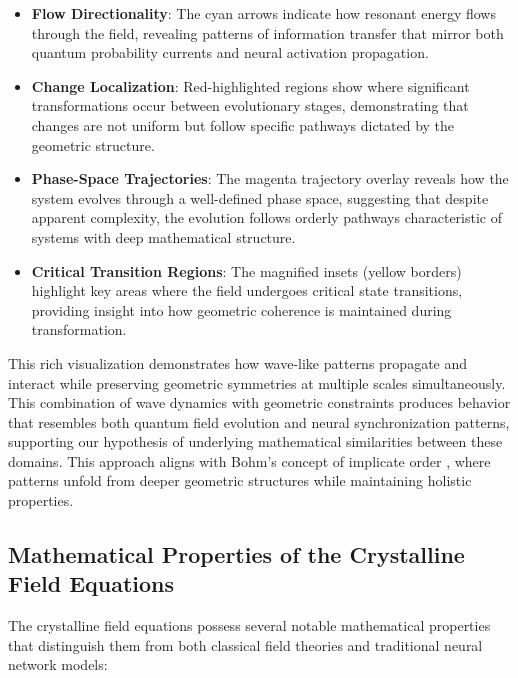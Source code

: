 \documentclass[12pt,letterpaper]{article}
\begin{document}
\begin{itemize}
    \item \textbf{Flow Directionality}: The cyan arrows indicate how resonant energy flows through the field, revealing patterns of information transfer that mirror both quantum probability currents and neural activation propagation.
    \item \textbf{Change Localization}: Red-highlighted regions show where significant transformations occur between evolutionary stages, demonstrating that changes are not uniform but follow specific pathways dictated by the geometric structure.
    \item \textbf{Phase-Space Trajectories}: The magenta trajectory overlay reveals how the system evolves through a well-defined phase space, suggesting that despite apparent complexity, the evolution follows orderly pathways characteristic of systems with deep mathematical structure.
    \item \textbf{Critical Transition Regions}: The magnified insets (yellow borders) highlight key areas where the field undergoes critical state transitions, providing insight into how geometric coherence is maintained during transformation.
\end{itemize}

This rich visualization demonstrates how wave-like patterns propagate and interact while preserving geometric symmetries at multiple scales simultaneously. This combination of wave dynamics with geometric constraints produces behavior that resembles both quantum field evolution and neural synchronization patterns, supporting our hypothesis of underlying mathematical similarities between these domains. This approach aligns with Bohm's concept of implicate order \cite{bohm1980wholeness}, where patterns unfold from deeper geometric structures while maintaining holistic properties.

\vspace{2mm}
\subsection{Mathematical Properties of the Crystalline Field Equations}
\label{subsec:mathematical_properties}

The crystalline field equations possess several notable mathematical properties that distinguish them from both classical field theories and traditional neural network models:
\end{document}
